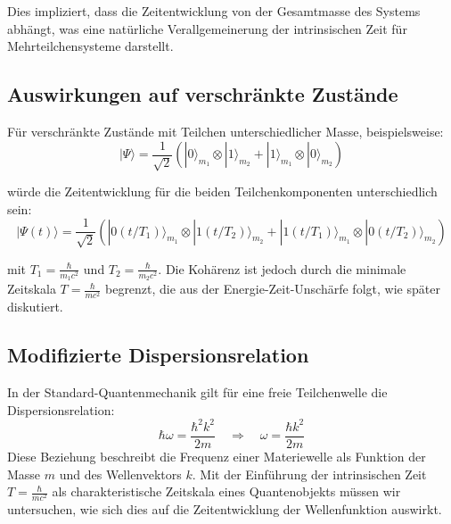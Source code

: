 \documentclass{article}
\begin{document}
	Dies impliziert, dass die Zeitentwicklung von der Gesamtmasse des Systems abhängt, was eine natürliche Verallgemeinerung der intrinsischen Zeit für Mehrteilchensysteme darstellt.
	
	\subsection{Auswirkungen auf verschränkte Zustände}
	
	Für verschränkte Zustände mit Teilchen unterschiedlicher Masse, beispielsweise:
	\begin{equation}
		|\Psi\rangle = \frac{1}{\sqrt{2}}(|0\rangle_{m_1} \otimes |1\rangle_{m_2} + |1\rangle_{m_1} \otimes |0\rangle_{m_2})
	\end{equation}
	
	würde die Zeitentwicklung für die beiden Teilchenkomponenten unterschiedlich sein:
	\begin{equation}
		|\Psi(t)\rangle = \frac{1}{\sqrt{2}}(|0(t/T_1)\rangle_{m_1} \otimes |1(t/T_2)\rangle_{m_2} + |1(t/T_1)\rangle_{m_1} \otimes |0(t/T_2)\rangle_{m_2})
	\end{equation}
	
	mit $T_1 = \frac{\hbar}{m_1 c^2}$ und $T_2 = \frac{\hbar}{m_2 c^2}$. Die Kohärenz ist jedoch durch die minimale Zeitskala $T = \frac{\hbar}{mc^2}$ begrenzt, die aus der Energie-Zeit-Unschärfe folgt, wie später diskutiert.
	
	\subsection{Modifizierte Dispersionsrelation}
	
	In der Standard-Quantenmechanik gilt für eine freie Teilchenwelle die Dispersionsrelation:
	\begin{equation}
		\hbar \omega = \frac{\hbar^2 k^2}{2m} \quad \Rightarrow \quad \omega = \frac{\hbar k^2}{2m}
	\end{equation}
	Diese Beziehung beschreibt die Frequenz einer Materiewelle als Funktion der Masse $m$ und des Wellenvektors $k$. Mit der Einführung der intrinsischen Zeit $T = \frac{\hbar}{mc^2}$ als charakteristische Zeitskala eines Quantenobjekts müssen wir untersuchen, wie sich dies auf die Zeitentwicklung der Wellenfunktion auswirkt.
	
\end{document}
